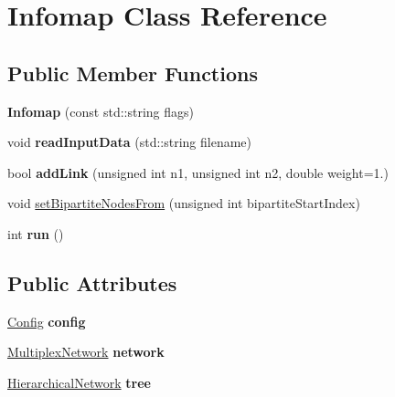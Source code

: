 \hypertarget{classInfomap}{}\section{Infomap Class Reference}
\label{classInfomap}
\subsection*{Public Member Functions}
\begin{DoxyCompactItemize}
\item 
\mbox{\label{classInfomap_a4251dd2b76af966d9d3ba505abd60018}} 
{\bfseries Infomap} (const std\+::string flags)
\item 
\mbox{\label{classInfomap_afa1e883fbcca6b4209fc76282b06d801}} 
void {\bfseries read\+Input\+Data} (std\+::string filename)
\item 
\mbox{\label{classInfomap_a9bd57986bdff3f060635d9933fbd3ff2}} 
bool {\bfseries add\+Link} (unsigned int n1, unsigned int n2, double weight=1.)
\item 
void \mbox{\hyperlink{classInfomap_ade43d1ba11abfdc5346870ae2b7fc851}{set\+Bipartite\+Nodes\+From}} (unsigned int bipartite\+Start\+Index)
\item 
\mbox{\label{classInfomap_a793283823dec45eb768b958616f48b85}} 
int {\bfseries run} ()
\end{DoxyCompactItemize}
\subsection*{Public Attributes}
\begin{DoxyCompactItemize}
\item 
\mbox{\label{classInfomap_a444552207aca65648974467c9834ad89}} 
\mbox{\hyperlink{structConfig}{Config}} {\bfseries config}
\item 
\mbox{\label{classInfomap_ab1707423fbf1288fbb47968a34462cfd}} 
\mbox{\hyperlink{classMultiplexNetwork}{Multiplex\+Network}} {\bfseries network}
\item 
\mbox{\label{classInfomap_a369af8f9f1d795309376d2960bc9aaa6}} 
\mbox{\hyperlink{classHierarchicalNetwork}{Hierarchical\+Network}} {\bfseries tree}
\end{DoxyCompactItemize}


